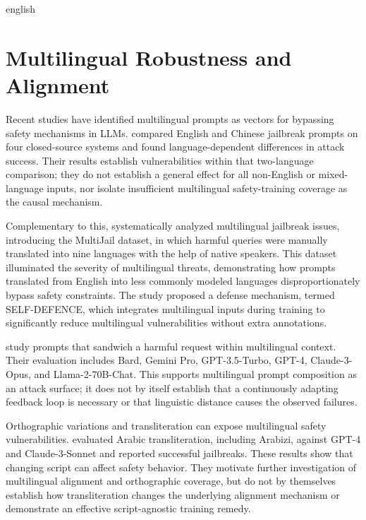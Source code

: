 \begin{otherlanguage*}{english}
\begin{description}
\end{description}

	\section{Multilingual Robustness and Alignment}
    
Recent studies have identified multilingual prompts as vectors for bypassing safety mechanisms in LLMs. \textcite{huangTowerBabelRevisited2025} compared English and Chinese jailbreak prompts on four closed-source systems and found language-dependent differences in attack success. Their results establish vulnerabilities within that two-language comparison; they do not establish a general effect for all non-English or mixed-language inputs, nor isolate insufficient multilingual safety-training coverage as the causal mechanism.

Complementary to this, \textcite{dengMultilingualJailbreakChallenges2024} systematically analyzed multilingual jailbreak issues, introducing the MultiJail dataset, in which harmful queries were manually translated into nine languages with the help of native speakers. This dataset illuminated the severity of multilingual threats, demonstrating how prompts translated from English into less commonly modeled languages disproportionately bypass safety constraints. The study proposed a defense mechanism, termed SELF-DEFENCE, which integrates multilingual inputs during training to significantly reduce multilingual vulnerabilities without extra annotations.

\textcite{upadhayaySandwichAttackMultilanguage2024} study prompts that sandwich a harmful request within multilingual context. Their evaluation includes Bard, Gemini Pro, GPT-3.5-Turbo, GPT-4, Claude-3-Opus, and Llama-2-70B-Chat. This supports multilingual prompt composition as an attack surface; it does not by itself establish that a continuously adapting feedback loop is necessary or that linguistic distance causes the observed failures.

Orthographic variations and transliteration can expose multilingual safety vulnerabilities. \textcite{ghanimJailbreakingLLMsArabic2024} evaluated Arabic transliteration, including Arabizi, against GPT-4 and Claude-3-Sonnet and reported successful jailbreaks. These results show that changing script can affect safety behavior. They motivate further investigation of multilingual alignment and orthographic coverage, but do not by themselves establish how transliteration changes the underlying alignment mechanism or demonstrate an effective script-agnostic training remedy.


\end{otherlanguage*}

